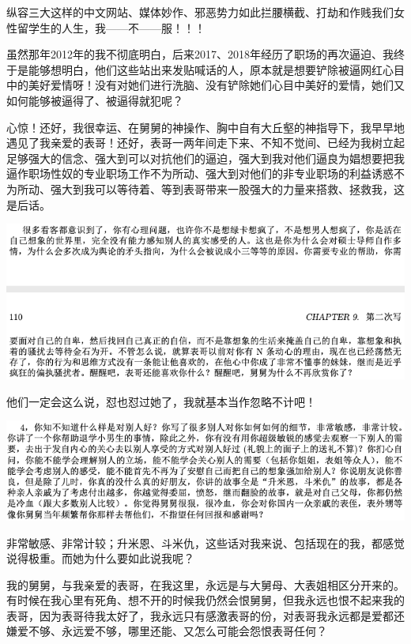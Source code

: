 \documentclass[9pt, b5paper]{article}
\begin{document}
纵容三大这样的中文网站、媒体妙作、邪恶势力如此拦腰横截、打劫和作贱我们女性留学生的人生，我——不——服！！！

虽然那年2012年的我不彻底明白，后来2017、2018年经历了职场的再次逼迫、我终于是能够想明白，他们这些站出来发贴喊话的人，原本就是想要铲除被逼网红心目中的美好爱情呀！没有对她们进行洗脑、没有铲除她们心目中美好的爱情，她们又如何能够被逼得了、被逼得就犯呢？

心惊！还好，我很幸运、在舅舅的神操作、胸中自有大丘壑的神指导下，我早早地遇见了我亲爱的表哥！还好，表哥一两年间走下来、不知不觉间、已经为我树立起足够强大的信念、强大到可以对抗他们的逼迫，强大到我对他们逼良为娼想要把我逼作职场性奴的专业职场工作不为所动、强大到对他们的非专业职场的利益诱惑不为所动、强大到我可以等待着、等到表哥带来一股强大的力量来搭救、拯救我，这是后话。 

\begin{center}
\includegraphics[width=.9\linewidth]{./pic/p1p109-6.png}
\end{center}

他们一定会这么说，怼也怼过她了，我就基本当作忽略不计吧！

\begin{center}
\includegraphics[width=.9\linewidth]{./pic/p1p110-1.png}
\end{center}

非常敏感、非常计较；升米恩、斗米仇，这些话对我来说、包括现在的我，都感觉说得极重。而她为什么要如此说我呢？

我的舅舅，与我亲爱的表哥，在我这里，永远是与大舅母、大表姐相区分开来的。有时候在我心里有死角、想不开的时候我仍然会恨舅舅，但我永远也恨不起来我的表哥，因为表哥待我太好了，我永远只有感激表哥的份，对表哥我永远都是爱都还嫌爱不够、永远爱不够，哪里还能、又怎么可能会怨恨表哥任何？
\end{document}

